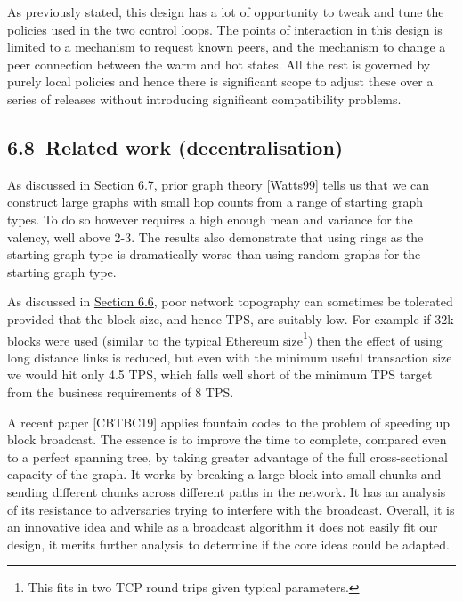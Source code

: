 \documentclass[]{article}
\begin{document}
As previously stated, this design has a lot of opportunity to tweak and
tune the policies used in the two control loops. The points of
interaction in this design is limited to a mechanism to request known
peers, and the mechanism to change a peer connection between the warm
and hot states. All the rest is governed by purely local policies and
hence there is significant scope to adjust these over a series of
releases without introducing significant compatibility problems.

\hypertarget{related-work-decentralisation}{%
\subsection{​6.8​~Related work
(decentralisation)}\label{related-work-decentralisation}}

As discussed in \protect\hyperlink{decentralisation-design}{{Section
6.7}}, prior graph theory {[}Watts99{]} tells us that we can construct
large graphs with small hop counts from a range of starting graph types.
To do so however requires a high enough mean and variance for the
valency, well above 2-3. The results also demonstrate that using rings
as the starting graph type is dramatically worse than using random
graphs for the starting graph type.

As discussed in
\protect\hyperlink{decentralisation-constraints}{{Section 6.6}}, poor
network topography can sometimes be tolerated provided that the block
size, and hence TPS, are suitably low. For example if 32k blocks were
used (similar to the typical Ethereum size\footnote{This fits in two TCP
  round trips given typical parameters.}) then the effect of using long
distance links is reduced, but even with the minimum useful transaction
size we would hit only 4.5 TPS, which falls well short of the minimum
TPS target from the business requirements of 8 TPS.

A recent paper {[}CBTBC19{]} applies fountain codes to the problem of
speeding up block broadcast. The essence is to improve the time to
complete, compared even to a perfect spanning tree, by taking greater
advantage of the full cross-sectional capacity of the graph. It works by
breaking a large block into small chunks and sending different chunks
across different paths in the network. It has an analysis of its
resistance to adversaries trying to interfere with the broadcast.
Overall, it is an innovative idea and while as a broadcast algorithm it
does not easily fit our design, it merits further analysis to determine
if the core ideas could be adapted.
\end{document}
